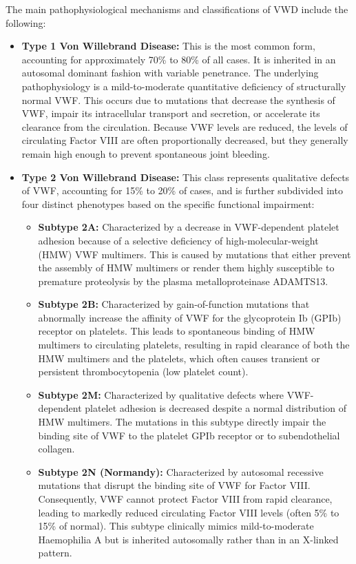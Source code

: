 The main pathophysiological mechanisms and classifications of VWD include the following:
\begin{itemize}
    \item \textbf{Type 1 Von Willebrand Disease:} This is the most common form, accounting for approximately 70\% to 80\% of all cases. It is inherited in an autosomal dominant fashion with variable penetrance. The underlying pathophysiology is a mild-to-moderate quantitative deficiency of structurally normal VWF. This occurs due to mutations that decrease the synthesis of VWF, impair its intracellular transport and secretion, or accelerate its clearance from the circulation. Because VWF levels are reduced, the levels of circulating Factor VIII are often proportionally decreased, but they generally remain high enough to prevent spontaneous joint bleeding.
    \item \textbf{Type 2 Von Willebrand Disease:} This class represents qualitative defects of VWF, accounting for 15\% to 20\% of cases, and is further subdivided into four distinct phenotypes based on the specific functional impairment:
    \begin{itemize}
        \item \textbf{Subtype 2A:} Characterized by a decrease in VWF-dependent platelet adhesion because of a selective deficiency of high-molecular-weight (HMW) VWF multimers. This is caused by mutations that either prevent the assembly of HMW multimers or render them highly susceptible to premature proteolysis by the plasma metalloproteinase ADAMTS13.
        \item \textbf{Subtype 2B:} Characterized by gain-of-function mutations that abnormally increase the affinity of VWF for the glycoprotein Ib (GPIb) receptor on platelets. This leads to spontaneous binding of HMW multimers to circulating platelets, resulting in rapid clearance of both the HMW multimers and the platelets, which often causes transient or persistent thrombocytopenia (low platelet count).
        \item \textbf{Subtype 2M:} Characterized by qualitative defects where VWF-dependent platelet adhesion is decreased despite a normal distribution of HMW multimers. The mutations in this subtype directly impair the binding site of VWF to the platelet GPIb receptor or to subendothelial collagen.
        \item \textbf{Subtype 2N (Normandy):} Characterized by autosomal recessive mutations that disrupt the binding site of VWF for Factor VIII. Consequently, VWF cannot protect Factor VIII from rapid clearance, leading to markedly reduced circulating Factor VIII levels (often 5\% to 15\% of normal). This subtype clinically mimics mild-to-moderate Haemophilia A but is inherited autosomally rather than in an X-linked pattern.

\end{itemize}
\end{itemize}
